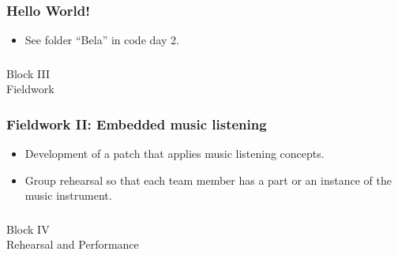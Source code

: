 \documentclass[screen, aspectratio=169]{beamer}
\begin{document}
%
\begin{frame}
  \frametitle{Hello World!}
       \begin{itemize}
     \item See folder ``Bela'' in code day 2.
     \end{itemize}
\end{frame}
%
%
\usebackgroundtemplate{}
\begin{frame}
\frametitle{}
{\huge Block III\\Fieldwork}
\end{frame}
%
\begin{frame}
  \frametitle{Fieldwork II: Embedded music listening}
        \begin{itemize}
	\item Development of a patch that applies music listening concepts.
	\item Group rehearsal so that each team member has a part or an instance of the music instrument.
    \end{itemize} 
\end{frame}
%
\usebackgroundtemplate{}
\begin{frame}
\frametitle{}
{\huge Block IV\\Rehearsal and Performance}
\end{frame}









%
%
\end{document}
